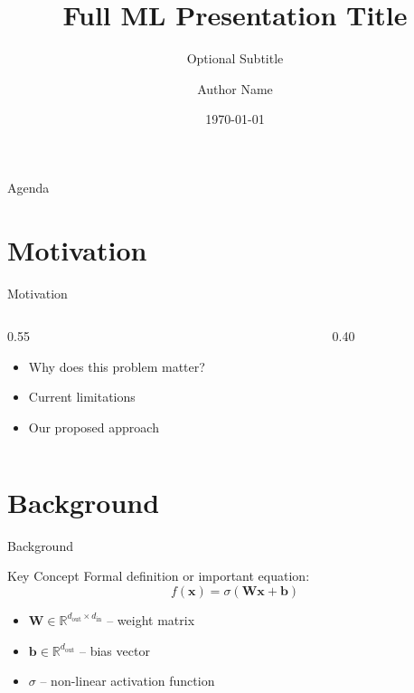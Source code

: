 \documentclass[aspectratio=169,12pt]{beamer}
\title[Short Title]{Full ML Presentation Title}
\subtitle{Optional Subtitle}
\author[Author]{Author Name}
\institute[Inst.]{Department \\ University / Organization}
\date{\today}
\newcommand{\R}{\mathbb{R}}
\newcommand{\vect}[1]{\bm{#1}}
\newcommand{\mat}[1]{\mathbf{#1}}
\begin{document}
\begin{frame}
  \titlepage
\end{frame}

\begin{frame}{Agenda}
  \tableofcontents
\end{frame}

\section{Motivation}

\begin{frame}{Motivation}
  \begin{columns}[T]
    \begin{column}{0.55\textwidth}
      \begin{itemize}
        \item Why does this problem matter?
        \item Current limitations
        \item Our proposed approach
      \end{itemize}
    \end{column}
    \hfill
    \begin{column}{0.40\textwidth}
    \end{column}
  \end{columns}
\end{frame}

\section{Background}

\begin{frame}{Background}
  \begin{block}{Key Concept}
    Formal definition or important equation:
    \begin{equation}
      f(\vect{x}) = \sigma\!\left(\mat{W}\vect{x} + \vect{b}\right)
    \end{equation}
  \end{block}
  \vspace{0.5em}
  \begin{itemize}
    \item $\mat{W} \in \R^{d_{\text{out}} \times d_{\text{in}}}$ -- weight matrix
    \item $\vect{b} \in \R^{d_{\text{out}}}$ -- bias vector
    \item $\sigma$ -- non-linear activation function
  \end{itemize}
\end{frame}
\end{document}
